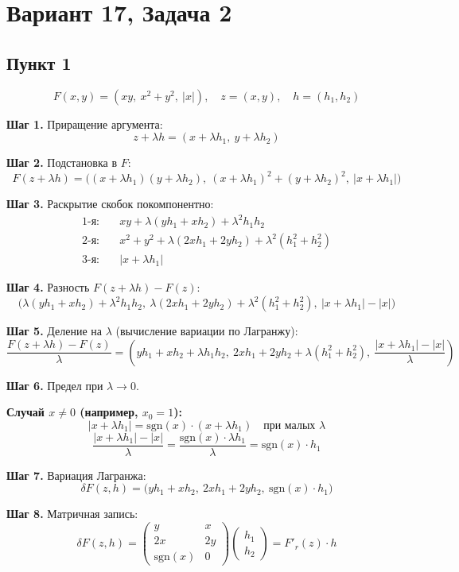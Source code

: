 \documentclass[a4paper, 12pt]{article}
\begin{document}
\section*{Вариант 17, Задача 2}

\subsection*{Пункт 1}

\[
F(x, y) = (xy, \ x^2 + y^2, \ |x|), \quad z = (x, y), \quad h = (h_1, h_2)
\]

\textbf{Шаг 1.} Приращение аргумента:
\[
z + \lambda h = (x + \lambda h_1, \ y + \lambda h_2)
\]

\textbf{Шаг 2.} Подстановка в $F$:
\[
F(z + \lambda h) = \Big( (x + \lambda h_1)(y + \lambda h_2), \ (x + \lambda h_1)^2 + (y + \lambda h_2)^2, \ |x + \lambda h_1| \Big)
\]

\textbf{Шаг 3.} Раскрытие скобок покомпонентно:
\begin{align*}
1\text{-я:} & \quad xy + \lambda(y h_1 + x h_2) + \lambda^2 h_1 h_2 \\
2\text{-я:} & \quad x^2 + y^2 + \lambda(2x h_1 + 2y h_2) + \lambda^2(h_1^2 + h_2^2) \\
3\text{-я:} & \quad |x + \lambda h_1|
\end{align*}

\textbf{Шаг 4.} Разность $F(z + \lambda h) - F(z)$:
\[
\Big( \lambda(y h_1 + x h_2) + \lambda^2 h_1 h_2, \ \lambda(2x h_1 + 2y h_2) + \lambda^2(h_1^2 + h_2^2), \ |x + \lambda h_1| - |x| \Big)
\]

\textbf{Шаг 5.} Деление на $\lambda$ (вычисление вариации по Лагранжу):
\[
\frac{F(z + \lambda h) - F(z)}{\lambda} = \left( y h_1 + x h_2 + \lambda h_1 h_2, \ 2x h_1 + 2y h_2 + \lambda(h_1^2 + h_2^2), \ \frac{|x + \lambda h_1| - |x|}{\lambda} \right)
\]

\textbf{Шаг 6.} Предел при $\lambda \to 0$.

\vspace{0.2cm}
\textbf{Случай $x \neq 0$ (например, $x_0 = 1$):}
\[
|x + \lambda h_1| = \text{sgn}(x) \cdot (x + \lambda h_1) \quad \text{при малых } \lambda
\]
\[
\frac{|x + \lambda h_1| - |x|}{\lambda} = \frac{\text{sgn}(x) \cdot \lambda h_1}{\lambda} = \text{sgn}(x) \cdot h_1
\]

\textbf{Шаг 7.} Вариация Лагранжа:
\[
\delta F(z, h) = \big( y h_1 + x h_2, \ 2x h_1 + 2y h_2, \ \text{sgn}(x) \cdot h_1 \big)
\]

\textbf{Шаг 8.} Матричная запись:
\[
\delta F(z, h) = 
\begin{pmatrix}
y & x \\
2x & 2y \\
\text{sgn}(x) & 0
\end{pmatrix}
\begin{pmatrix}
h_1 \\
h_2
\end{pmatrix}
= F'_r(z) \cdot h
\]
\newpage
\end{document}
